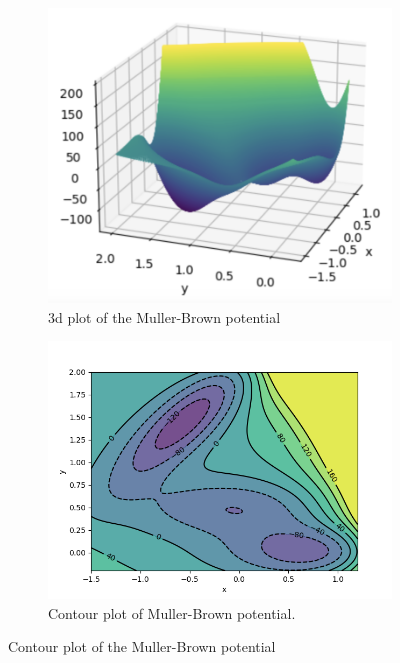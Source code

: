 \documentclass{article}
\begin{document}
    \begin{figure}[H]
\begin{subfigure}{0.5\textwidth}
  \centering
  \includegraphics[width=\linewidth]{images/MullerB-potential-plot-3d.png}
  \caption{3d plot of the Muller-Brown potential}
  \label{fig: muller-brown 3d}
\end{subfigure}%
\begin{subfigure}{0.5\textwidth}
  \centering
  \includegraphics[width=\linewidth]{images/MullerB-contour-with-grad-field.png}
  \caption{Contour plot of Muller-Brown potential.}
  \label{fig:  muller-brown contour}
\end{subfigure}
\caption{Contour plot of the Muller-Brown potential}
\label{fig:  muller-brown plots}
\end{figure}
\end{document}
